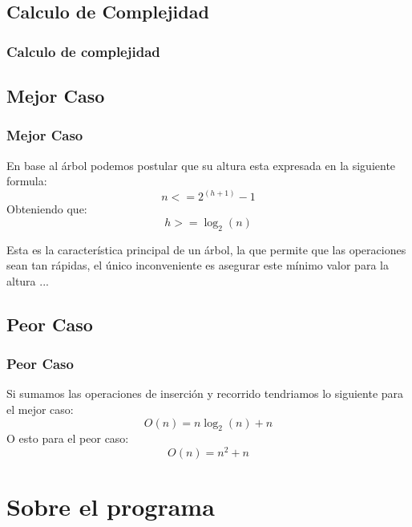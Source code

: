 \documentclass{beamer}
\begin{document}
	\subsection{Calculo de Complejidad}

		\begin{frame}
			\frametitle{Calculo de complejidad}
			
		\end{frame}


	\subsection{Mejor Caso}

		\begin{frame}
			\frametitle{Mejor Caso}
			En base al árbol podemos postular que su altura esta expresada en la siguiente formula:
				\begin{equation}
					n < = 2^{(h + 1)} - 1
				\end{equation}
				Obteniendo que:
				\begin{equation}
					h >= \log_2{(n)}
				\end{equation}
				
			Esta es la característica principal de un árbol, la que permite que las operaciones sean tan rápidas, el único inconveniente es asegurar este mínimo valor para la altura ...
		\end{frame}
	\subsection{Peor Caso}
		\begin{frame}
			\frametitle{Peor Caso}
			Si sumamos las operaciones de inserción y recorrido tendriamos lo siguiente para el mejor caso:
			\begin{equation}
				O(n) = n  \log_2{(n)} + n
			\end{equation}
			O esto para el peor caso:
			\begin{equation}
				O(n) = n^2 + n
			\end{equation}
		\end{frame}

\section{Sobre el programa}
\end{document}
